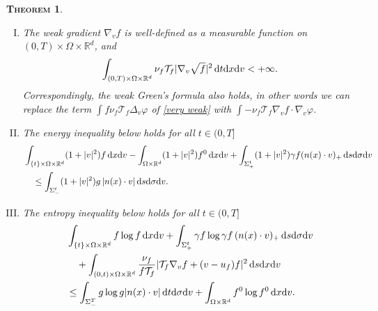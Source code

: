 \documentclass[10pt, reqno]{amsart}
\theoremstyle{plain}
\newtheorem{theorem}{\normalfont \scshape Theorem}[section]
\theoremstyle{definition}
\theoremstyle{remark}
\numberwithin{equation}{section}
\newcommand{\calT}{\mathcal T}
\newcommand{\R}{\mathbb{R}}
\newcommand{\dx}{\textnormal{d}x}
\newcommand{\dv}{\textnormal{d}v}
\newcommand{\dt}{\textnormal{d}t}
\newcommand{\ds}{\textnormal{d}s}
\newcommand{\tnd}{\textnormal{d}}
\begin{document}
\begin{theorem}
\begin{enumerate}[(I)]
\begin{equation}
\begin{split}
        &\quad = -\int_{\Sigma_-^t} g \varphi (n(x)\cdot v)_- \,\ds\tnd\sigma\dv   + \int_{(0,t)\times \Omega\times\R^d} f \nu_f \calT_f \Delta_v \varphi - \nu_f \nabla_v\varphi\cdot (v-u_f) f \; \ds\dx\dv.
    \end{split}
    \end{equation}
    \item The weak gradient $\nabla_v f$ is well-defined as a measurable function on $(0,T)\times\Omega\times\R^d$, and
    \begin{align*}
        \int_{(0,T)\times \Omega\times \R^d} \nu_f \calT_f |\nabla_v \sqrt{f}|^2 \,\dt\dx\dv < +\infty.
    \end{align*}
    Correspondingly, the weak Green's formula also holds, in other words we can replace the term $\int f \nu_f \calT_f \Delta_v \varphi$ of \eqref{very weak} with $\int - \nu_f \calT_f \nabla_v f \cdot \nabla_v\varphi$. 
    \item The energy inequality below holds for all $t\in (0,T]$
    \begin{equation*}
    \begin{split}
        &\int_{\{t\}\times \Omega\times \R^d} (1+|v|^2) f \,\dx\dv - \int_{\Omega \times \R^d} (1+|v|^2)f^0 \,\dx\dv  + \int_{\Sigma_+^t} (1+|v|^2) \gamma f(n(x)\cdot v)_+ \,\ds\tnd\sigma\dv \\
        &\quad \le \int_{\Sigma_-^t} (1+|v|^2) g\,|n(x)\cdot v| \,\ds\tnd\sigma\dv.
    \end{split}
    \end{equation*}
    \item The entropy inequality below holds for all $t\in (0,T]$
    \begin{equation*}
    \begin{split}
        &\int_{\{t\}\times\Omega\times\R^d} f\log f \,\dx\dv + \int_{\Sigma_+^t} \gamma f \log \gamma f \,(n(x)\cdot v)_+ \,\ds\tnd\sigma\dv \\
        &\quad + \int_{(0,t)\times \Omega\times\R^d}  \frac{\nu_f}{f \calT_f}|\calT_f \nabla_v f + (v-u_f)f|^2 \,\ds\dx\dv \\
        &\le  \int_{\Sigma_-^T} g\log g |n(x)\cdot v|\,\dt\tnd\sigma\dv +  \int_{\Omega\times\R^d} f^0 \log f^0 \,\dx\dv.
    \end{split}
    \end{equation*}
    \end{enumerate}
\end{theorem}
\end{document}
